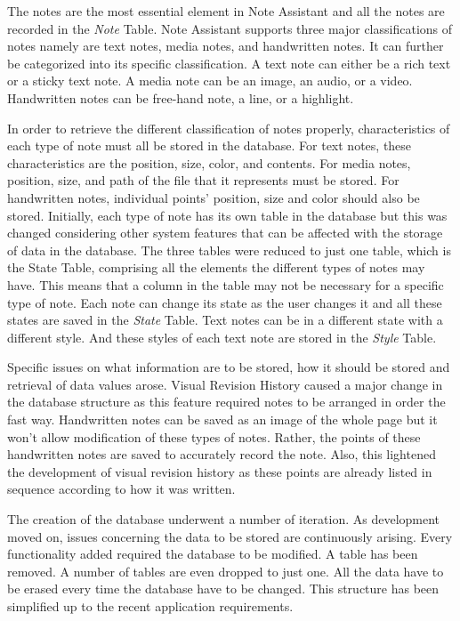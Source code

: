 The notes are the most essential element in Note Assistant and all the notes are recorded in the \textit{Note} Table.  Note Assistant supports three major classifications of notes namely are text notes, media notes, and handwritten notes. It can further be categorized into its specific classification. A text note can either be a rich text or a sticky text note. A media note can be an image, an audio, or a video. Handwritten notes can be free-hand note, a line, or a highlight.

In order to retrieve the different classification of notes properly, characteristics of each type of note must all be stored in the database. For text notes, these characteristics are the position, size, color, and contents. For media notes, position, size, and path of the file that it represents must be stored. For handwritten notes, individual points' position, size and color should also be stored. Initially, each type of note has its own table in the database but this was changed considering other system features that can be affected with the storage of data in the database. The three tables were reduced to just one table, which is the State Table, comprising all the elements the different types of notes may have. This means that a column in the table may not be necessary for a specific type of note. Each note can change its state as the user changes it and all these states are saved in the \textit{State} Table. Text notes can be in a different state with a different style. And these styles of each text note are stored in the \textit{Style} Table.

	Specific issues on what information are to be stored, how it should be stored and retrieval of data values arose. Visual Revision History caused a major change in the database structure as this feature required notes to be arranged in order the fast way. Handwritten notes can be saved as an image of the whole page but it won't allow modification of these types of notes. Rather, the points of these handwritten notes are saved to accurately record the note. Also, this lightened the development of visual revision history as these points are already listed in sequence according to how it was written.

The creation of the database underwent a number of iteration. As development moved on, issues concerning the data to be stored are continuously arising. Every functionality added required the database to be modified. A table has been removed. A number of tables are even dropped to just one. All the data have to be erased every time the database have to be changed. This structure has been simplified up to the recent application requirements.

